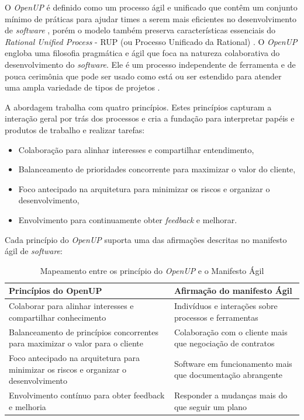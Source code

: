 \documentclass{acm_proc_article-sp}
\begin{document}
O \textit{OpenUP} é definido como um processo ágil e unificado que contêm um conjunto mínimo de práticas para ajudar times a serem mais eficientes no desenvolvimento de \textit{software} \cite{openUP:agil}, porém o modelo também preserva características essenciais do \textit{Rational Unified Process} - RUP (ou Processo Unificado da Rational) \cite{openUP:hibrido}. O \textit{OpenUP} engloba uma filosofia pragmática e ágil que foca na natureza colaborativa do desenvolvimento do \textit{software}. Ele é um processo independente de ferramenta e de pouca cerimônia que pode ser usado como está ou ser estendido para atender uma ampla variedade de tipos de projetos \cite{openUP:agil}.

A abordagem trabalha com quatro princípios. Estes princípios capturam a interação geral por trás dos processos e cria a fundação para interpretar papéis e produtos de trabalho e realizar tarefas:

\begin{itemize}
\item Colaboração para alinhar interesses e compartilhar entendimento,
\item Balanceamento de prioridades concorrente para maximizar o valor do cliente,
\item Foco antecipado na arquitetura para minimizar os riscos e organizar o desenvolvimento,
\item Envolvimento para continuamente obter \textit{feedback} e melhorar.
\end{itemize}

Cada princípio do \textit{OpenUP} suporta uma das afirmações descritas no manifesto ágil de \textit{software}:

\begin{table}[h]
\scriptsize
\caption{Mapeamento entre os princípio do \textit{OpenUP} e o Manifesto Ágil \cite{openUP:agil}} 
\centering
\begin{tabular}{|p{70mm}|p{70mm}|}
\hline
 \textbf{Princípios do OpenUP} & \textbf{Afirmação do manifesto Ágil} \\
\hline
Colaborar para alinhar interesses e compartilhar conhecimento & Indivíduos e interações sobre processos e ferramentas \\
Balanceamento de princípios concorrentes para maximizar o valor para o cliente & Colaboração com o cliente mais que negociação de contratos \\
Foco antecipado na arquitetura para minimizar os riscos e organizar o desenvolvimento & Software em funcionamento mais que documentação abrangente \\
Envolvimento contínuo para obter feedback e melhoria & Responder a mudanças mais do que seguir um plano \\ 
\hline
\end{tabular}
\end{table}
\end{document}
